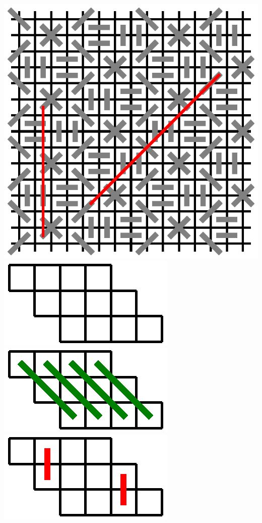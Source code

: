 \documentclass{article}
\begin{document}
\includegraphics{m-n-9.eps}
\\
\includegraphics{m-n-8-little.eps}
\\
\includegraphics{8-rules1.eps}
\includegraphics{8-rules2.eps}
\end{document}

